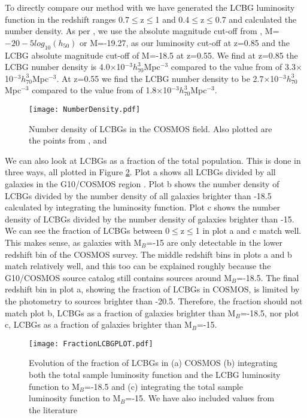 \documentclass[manuscript]{aastex61}
\begin{document}
To directly compare our method with \citet{1997ApJ...489..543P} we have generated the LCBG luminosity function in the redshift ranges 0.7$\leq$z$\leq$1 and 0.4$\leq$z$\leq$0.7 and calculated the number density. As per \citet{2004ApJ...617.1004W}, we use the absolute magnitude cut-off from \citet{1997ApJ...489..543P}, M=$-20-5log_{10}(h_{50})$ or M=-19.27, as our luminosity cut-off at z=0.85 and the LCBG absolute magnitude cut-off of M=-18.5 at z=0.55. We find at z=0.85 the LCBG number density is 4.0$\times$10$^{-3}h_{70}^{3}$Mpc$^{-3}$ compared to the value from \citet{1997ApJ...489..543P} of 3.3$\times$10$^{-3}h_{70}^{3}$Mpc$^{-3}$. At z=0.55 we find the LCBG number density to be 2.7$\times$10$^{-3}h_{70}^{3}$Mpc$^{-3}$ compared to the value from \citet{1997ApJ...489..543P} of 1.8$\times$10$^{-3}h_{70}^{3}$Mpc$^{-3}$. 

\begin{center}
\begin{figure}
\texttt{[image: NumberDensity.pdf]}
\caption{Number density of LCBGs in the COSMOS field. Also plotted are the points from \citet{1997ApJ...489..543P}, and \citet{2004ApJ...617.1004W}}
\label{fig:NumDensEv}
\end{figure}
\end{center}

We can also look at LCBGs as a fraction of the total population. This is done in three ways, all plotted in Figure \ref{fig:Fracev}. Plot a shows all LCBGs divided by all galaxies in the G10/COSMOS region . Plot b shows the number density of LCBGs divided by the number density of all galaxies brighter than -18.5 calculated by integrating the luminosity function. Plot c shows the number density of LCBGs divided by the number density of galaxies brighter than -15. We can see the fraction of LCBGs between 0$\leq$z$\leq$1 in plot a and c match well. This makes sense, as galaxies with M$_{B}$=-15 are only detectable in the lower redshift bin of the COSMOS survey. The middle redshift bins in plots a and b match relatively well, and this too can be explained roughly because the G10/COSMOS source catalog still contains sources around M$_{B}$=-18.5. The final redshift bin in plot a, showing the fraction of LCBGs in COSMOS, is limited by the photometry to sources brighter than -20.5. Therefore, the fraction should not match plot b, LCBGs as a fraction of galaxies brighter than M$_{B}$=-18.5, nor plot c, LCBGs as a fraction of galaxies brighter than M$_{B}$=-15.

\begin{center}
\begin{figure}[!ht]
\texttt{[image: FractionLCBGPLOT.pdf]}
\caption{Evolution of the fraction of LCBGs in (a) COSMOS (b) integrating both the total sample luminosity function and the LCBG luminosity function to M$_{B}$=-18.5 and (c) integrating the total sample luminosity function to M$_{B}$=-15. We have also included values from the literature }
\label{fig:Fracev}
\end{figure}
\end{center}
\end{document}
